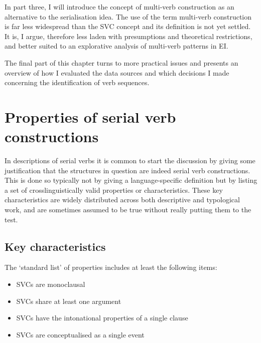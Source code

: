 In part three, I will introduce the concept of multi-verb construction as an alternative to the serialisation idea. The use of the term multi-verb construction is far less widespread than the SVC concept and its definition is not yet settled. It is, I argue, therefore less laden with presumptions and theoretical restrictions, and better suited to an explorative analysis of multi-verb patterns in EI. 

The final part of this chapter turns to more practical issues and presents an overview of how I evaluated the data sources and which decisions I made concerning the identification of verb sequences. 

\section{Properties of serial verb constructions} \label{section:properties}

In descriptions of serial verbs it is common to start the discussion by giving some justification that the structures in question are indeed serial verb constructions. This is done so typically not by giving a language-specific definition but by listing a set of crosslinguistically valid properties or characteristics. These key characteristics are widely distributed across both descriptive and typological work, and are sometimes assumed to be true without really putting them to the test. 

\subsection{Key characteristics} \label{subsection:keychars}

The `standard list' of properties includes at least the following items:

\begin{itemize}
\item SVCs are monoclausal
\item SVCs share at least one argument
\item SVCs have the intonational properties of a single clause
\item SVCs are conceptualised as a single event
\end{itemize}

